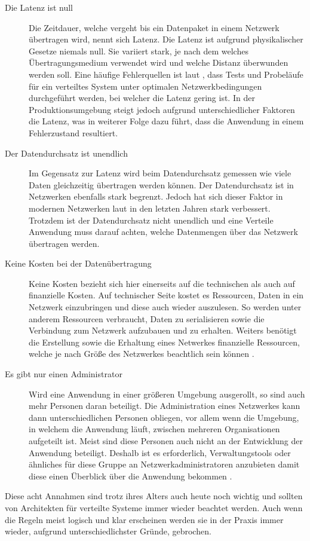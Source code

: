 \begin{description}
    \item[Die Latenz ist null]
    Die Zeitdauer, welche vergeht bis ein Datenpaket in einem Netzwerk übertragen wird, nennt sich Latenz. Die Latenz ist aufgrund physikalischer Gesetze niemals null. Sie variiert stark, je nach dem welches Übertragungsmedium verwendet wird und welche Distanz überwunden werden soll. Eine häufige  Fehlerquellen ist laut \cite{rotem2006fallacies}, dass Tests und Probeläufe für ein verteiltes System unter optimalen Netzwerkbedingungen durchgeführt werden, bei welcher die Latenz gering ist. In der Produktionsumgebung steigt jedoch aufgrund unterschiedlicher Faktoren die Latenz, was in weiterer Folge dazu führt, dass die Anwendung in einem Fehlerzustand resultiert. 
    \item[Der Datendurchsatz ist unendlich]
    Im Gegensatz zur Latenz wird beim Datendurchsatz gemessen wie viele Daten gleichzeitig übertragen werden können. Der Datendurchsatz ist in Netzwerken ebenfalls stark begrenzt. Jedoch hat sich dieser Faktor in modernen Netzwerken laut \cite{rotem2006fallacies} in den letzten Jahren stark verbessert. Trotzdem ist der Datendurchsatz nicht unendlich und eine Verteile Anwendung muss darauf achten, welche Datenmengen über das Netzwerk übertragen werden.  
    \item[Keine Kosten bei der Datenübertragung]
    Keine Kosten bezieht sich hier einerseits auf die technischen als auch auf finanzielle Kosten. Auf technischer Seite kostet es Ressourcen, Daten in ein Netzwerk einzubringen und diese auch wieder auszulesen. So werden unter anderem Ressourcen verbraucht, Daten zu serialisieren sowie die Verbindung zum Netzwerk aufzubauen und zu erhalten. Weiters benötigt die Erstellung sowie die Erhaltung eines Netwerkes finanzielle Ressourcen, welche je nach Größe des Netzwerkes beachtlich sein können \cite{rotem2006fallacies}.
    \item[Es gibt nur einen Administrator]
    Wird eine Anwendung in einer größeren Umgebung ausgerollt, so sind auch mehr Personen daran beteiligt. Die Administration eines Netzwerkes kann dann unterschiedlichen Personen obliegen, vor allem wenn die Umgebung, in welchem die Anwendung läuft, zwischen mehreren Organisationen aufgeteilt ist. Meist sind diese Personen auch nicht an der Entwicklung der Anwendung beteiligt. Deshalb ist es erforderlich, Verwaltungstools oder ähnliches für diese Gruppe an Netzwerkadministratoren anzubieten damit diese einen Überblick über die Anwendung bekommen \cite{rotem2006fallacies}.  
\end{description}
Diese acht Annahmen sind trotz ihres Alters auch heute noch wichtig und sollten von Architekten für verteilte Systeme immer wieder beachtet werden. Auch wenn die Regeln meist logisch und klar erscheinen werden sie in der Praxis immer wieder, aufgrund unterschiedlichster Gründe, gebrochen. \cite{rotem2006fallacies} 


